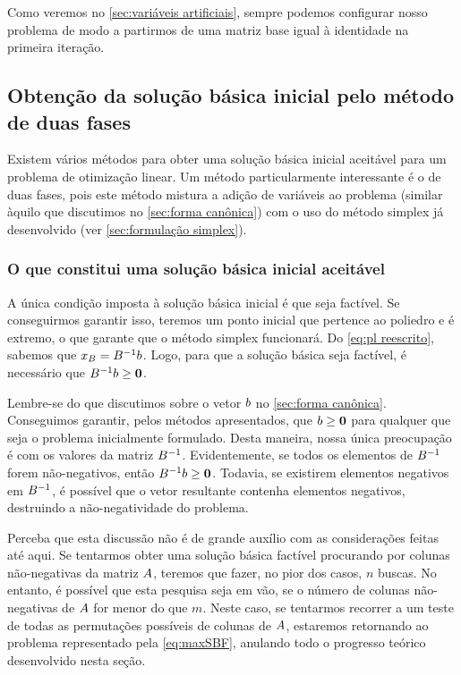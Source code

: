 Como veremos no \cref{sec:variáveis artificiais}, sempre podemos configurar nosso problema de modo a partirmos de uma matriz base igual à identidade na primeira iteração.

\subsection{Obtenção da solução básica inicial pelo método de duas fases}\label{sec:duas fases}
Existem vários métodos para obter uma solução básica inicial aceitável para um problema de otimização linear. Um método particularmente interessante é o de duas fases, pois este método mistura a adição de variáveis ao problema (similar àquilo que discutimos no \cref{sec:forma canônica}) com o uso do método simplex já desenvolvido (ver \cref{sec:formulação simplex}).

\subsubsection{O que constitui uma solução básica inicial aceitável}
A única condição imposta à solução básica inicial é que seja factível. Se conseguirmos garantir isso, teremos um ponto inicial que pertence ao poliedro e é extremo, o que garante que o método simplex funcionará. Do \cref{eq:pl reescrito}, sabemos que $  x_B = B^{-1}b$. Logo, para que a solução básica seja factível, é necessário que $B^{-1}b \geq \vb 0$.

Lembre-se do que discutimos sobre o vetor $b$ no \cref{sec:forma canônica}. Conseguimos garantir, pelos métodos apresentados, que $b \geq \vb 0$ para qualquer que seja o problema inicialmente formulado. Desta maneira, nossa única preocupação é com os valores da matriz $B^{-1}$. Evidentemente, se todos os elementos de $B^{-1}$ forem não-negativos, então $B^{-1}b \geq \vb 0$. Todavia, se existirem elementos negativos em $B^{-1}$, é possível que o vetor resultante contenha elementos negativos, destruindo a não-negatividade do problema.

Perceba que esta discussão não é de grande auxílio com as considerações feitas até aqui. Se tentarmos obter uma solução básica factível procurando por colunas não-negativas da matriz $A$, teremos que fazer, no pior dos casos, $n$ buscas. No entanto, é possível que esta pesquisa seja em vão, se o número de colunas não-negativas de $A$ for menor do que $m$. Neste caso, se tentarmos recorrer a um teste de todas as permutações possíveis de colunas de $A$, estaremos retornando ao problema representado pela \cref{eq:maxSBF}, anulando todo o progresso teórico desenvolvido nesta seção.

